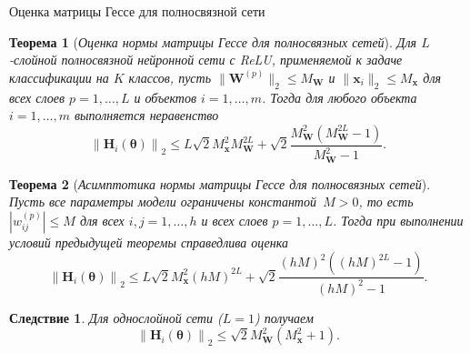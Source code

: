 \documentclass[10pt,pdf,hyperref={unicode}]{beamer}
\newtheorem{rustheorem}{Теорема}
\newtheorem{ruscorollary}{Следствие}
\begin{document}
\begin{frame}{Оценка матрицы Гессе для полносвязной сети}
\footnotesize
\begin{rustheorem}[\emph{Оценка нормы матрицы Гессе для полносвязных сетей}]
    \justifying
    Для $L$-слойной полносвязной нейронной сети с ReLU, применяемой к задаче классификации на $K$ классов, пусть $\| \mathbf{W}^{(p)} \|_2 \leqslant M_{\mathbf{W}}$ и $\| \mathbf{x}_i \|_2 \leqslant M_{\mathbf{x}}$ для всех слоев $p = 1, \ldots, L$ и объектов $i = 1, \ldots, m$.
    Тогда для любого объекта $i = 1, \ldots, m$ выполняется неравенство
    \[
        \left\| \mathbf{H}_i(\boldsymbol{\theta}) \right\|_2 \leqslant L \sqrt{2} M_{\mathbf{x}}^2 M_{\mathbf{W}}^{2L} + \sqrt{2} \frac{M_{\mathbf{W}}^2 (M_{\mathbf{W}}^{2L} - 1)}{M_{\mathbf{W}}^2 - 1}.
    \]
\end{rustheorem}

\begin{rustheorem}[\emph{Асимптотика нормы матрицы Гессе для полносвязных сетей}]
    \justifying
    Пусть все параметры модели ограничены константой~$M > 0$, то есть $|w_{ij}^{(p)}| \leqslant M$ для всех $i, j = 1, \ldots, h$ и всех слоев $p = 1, \ldots, L$. Тогда при выполнении условий предыдущей теоремы справедлива оценка
    \[
        \left\| \mathbf{H}_i(\boldsymbol{\theta}) \right\|_2 \leqslant L \sqrt{2} M_{\mathbf{x}}^2 (hM)^{2L} + \sqrt{2} \frac{(hM)^2 ((hM)^{2L} - 1)}{(hM)^2 - 1}.
    \]
\end{rustheorem}

\begin{ruscorollary}
    \justifying
    Для однослойной сети ($L=1$) получаем
    \[
        \left\| \mathbf{H}_i(\boldsymbol{\theta}) \right\|_2 \leqslant \sqrt{2} M_{\mathbf{W}}^{2} \left( M_{\mathbf{x}}^2 + 1 \right).
    \]
\end{ruscorollary}
\end{frame}
\end{document}
